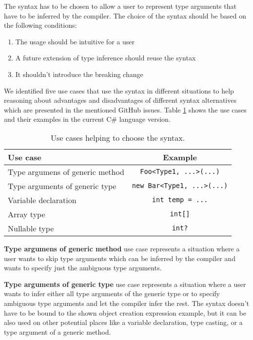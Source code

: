 The syntax has to be chosen to allow a user to represent type arguments that have to be inferred by the compiler.
The choice of the syntax should be based on the following conditions:
\begin{enumerate}
  \item The usage should be intuitive for a user
  \item A future extension of type inference should reuse the syntax
  \item It shouldn't introduce the breaking change
\end{enumerate}
We identified five use cases that use the syntax in different situations to help reasoning about advantages and disadvantages of different syntax alternatives which are presented in the mentioned GitHub issues.
Table \ref{table2:useCasesChar} shows the use cases and their examples in the current C\# language version.
\begin{table}[h]
\begin{center}
\begin{tabular}{ | l | c | } 
  \hline
  Use case & Example\\
  \hline
  Type argumens of generic method & \texttt{Foo<Type1, ...>(...)}\\
  \hline
  Type arguments of generic type & \texttt{new Bar<Type1, ...>(...)}\\
  \hline
  Variable declaration & \texttt{int temp = ...}\\
  \hline
  Array type & \texttt{int[]}\\
  \hline
  Nullable type & \texttt{int?}\\
  \hline
\end{tabular}
\end{center}
\caption{Use cases helping to choose the syntax.}
\label{table2:useCasesChar}
\end{table}
\par
\textbf{Type argumens of generic method} use case represents a situation where a user wants to skip type arguments which can be inferred by the compiler and wants to specify just the ambiguous type arguments.
\par
\textbf{Type arguments of generic type} use case represents a situation where a user wants to infer either all type arguments of the generic type or to specify ambiguous type arguments and let the compiler infer the rest. 
The syntax doesn’t have to be bound to the shown object creation expression example, but it can be also used on other potential places like a variable declaration, type casting, or a type argument of a generic method. 
